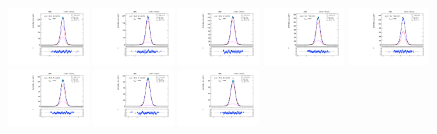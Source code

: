 \begin{figure}[htb]
\includegraphics[width=0.19\textwidth]{plots/Appendix_Recoil_Fits/ZmmMC_PF_13TeV_2G/pfu1fit_16.pdf}
\includegraphics[width=0.19\textwidth]{plots/Appendix_Recoil_Fits/ZmmMC_PF_13TeV_2G/pfu1fit_17.pdf}
\includegraphics[width=0.19\textwidth]{plots/Appendix_Recoil_Fits/ZmmMC_PF_13TeV_2G/pfu1fit_18.pdf}
\includegraphics[width=0.19\textwidth]{plots/Appendix_Recoil_Fits/ZmmMC_PF_13TeV_2G/pfu1fit_19.pdf}
\includegraphics[width=0.19\textwidth]{plots/Appendix_Recoil_Fits/ZmmMC_PF_13TeV_2G/pfu1fit_20.pdf}
\includegraphics[width=0.19\textwidth]{plots/Appendix_Recoil_Fits/ZmmMC_PF_13TeV_2G/pfu1fit_21.pdf}
\includegraphics[width=0.19\textwidth]{plots/Appendix_Recoil_Fits/ZmmMC_PF_13TeV_2G/pfu1fit_22.pdf}
\includegraphics[width=0.19\textwidth]{plots/Appendix_Recoil_Fits/ZmmMC_PF_13TeV_2G/pfu1fit_23.pdf}

\end{figure}
